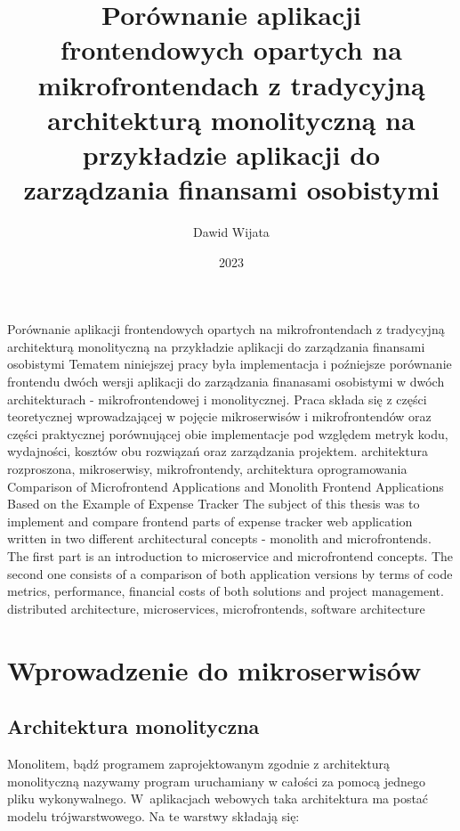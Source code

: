\documentclass{SGGW-thesis}
\title{Porównanie aplikacji frontendowych opartych na mikrofrontendach z tradycyjną architekturą monolityczną na przykładzie aplikacji do zarządzania finansami osobistymi}
\author{Dawid Wijata}
\date{2023}
\begin{document}
\maketitle
\statementpage
\abstractpage
{Porównanie aplikacji frontendowych opartych na mikrofrontendach z tradycyjną architekturą monolityczną na przykładzie aplikacji do zarządzania finansami osobistymi}
{Tematem niniejszej pracy była implementacja i poźniejsze porównanie frontendu dwóch wersji aplikacji do zarządzania finanasami osobistymi w dwóch architekturach - mikrofrontendowej i monolitycznej. Praca składa się z części teoretycznej wprowadzającej w pojęcie mikroserwisów i mikrofrontendów oraz części praktycznej porównującej obie implementacje pod względem metryk kodu, wydajności, kosztów obu rozwiązań oraz zarządzania projektem.}
{architektura rozproszona, mikroserwisy, mikrofrontendy, architektura oprogramowania}
{Comparison of Microfrontend Applications and Monolith Frontend Applications Based on the Example of Expense Tracker}
{The subject of this thesis was to implement and compare frontend parts of expense tracker web application written in two different architectural concepts - monolith and microfrontends. The first part is an introduction to microservice and microfrontend concepts. The second one consists of a comparison of both application versions by terms of code metrics, performance, financial costs of both solutions and project management.}
{distributed architecture, microservices, microfrontends, software architecture}



{
  \doublespacing
  \tableofcontents
}

\startchapterfromoddpage %

\chapter{Wprowadzenie do mikroserwisów}
  \section{Architektura monolityczna}
  Monolitem, bądź programem zaprojektowanym zgodnie z architekturą monolityczną nazywamy program uruchamiany w całości za pomocą jednego pliku wykonywalnego. W~aplikacjach webowych taka architektura ma postać modelu trójwarstwowego. Na te warstwy składają się:
  
\end{document}
